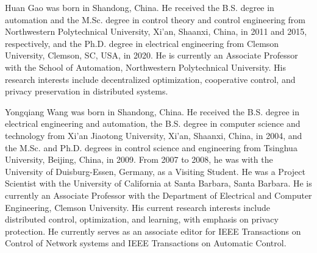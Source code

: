 \documentclass{IEEEtran}
\begin{document}



\begin{IEEEbiography}{Huan Gao} was born in Shandong, China. He received the B.S. degree in automation and the M.Sc. degree in control theory and control engineering from Northwestern Polytechnical University, Xi'an, Shaanxi, China, in 2011 and 2015, respectively, and the Ph.D. degree in electrical engineering from Clemson University, Clemson, SC, USA, in 2020. He is currently an Associate Professor with the School of Automation, Northwestern Polytechnical University. His research interests include decentralized optimization, cooperative control, and privacy preservation in distributed systems.
\end{IEEEbiography}

\begin{IEEEbiography}{Yongqiang Wang} was born in Shandong, China. He received the B.S. degree in electrical engineering and automation, the B.S. degree in computer science and technology from Xi'an Jiaotong University, Xi'an, Shaanxi, China, in 2004, and the M.Sc. and Ph.D. degrees in control science and engineering from Tsinghua University, Beijing, China, in 2009. From 2007 to 2008, he was with the University of Duisburg-Essen, Germany, as a Visiting Student. He was a Project Scientist with the University of California at Santa Barbara, Santa Barbara. He is currently an Associate Professor with the Department of Electrical and Computer Engineering, Clemson University. His current research interests include distributed control, optimization, and learning, with emphasis on privacy protection. He currently serves as an associate editor for IEEE Transactions on Control of Network systems and IEEE Transactions on Automatic Control.
\end{IEEEbiography}
\end{document}
